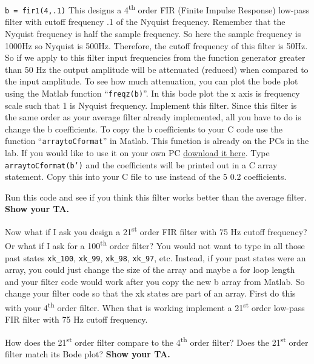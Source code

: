 \documentclass[11pt]{article}
\begin{document}
\texttt{b = fir1(4,.1)} This designs a 4\textsuperscript{th} order FIR (Finite Impulse Response) low-pass filter with cutoff frequency .1 of the Nyquist frequency. Remember that the Nyquist frequency is half the sample frequency. So here the sample frequency is 1000Hz so Nyquist is 500Hz. Therefore, the cutoff frequency of this filter is 50Hz. So if we apply to this filter input frequencies from the function generator greater than 50 Hz the output amplitude will be attenuated (reduced) when compared to the input amplitude. To see how much attenuation, you can plot the bode plot using the Matlab function “\texttt{freqz(b)}”. In this bode plot the x axis is frequency scale such that 1 is Nyquist frequency. Implement this filter. Since this filter is the same order as your average filter already implemented, all you have to do is change the b coefficients. To copy the b coefficients to your C code use the function “\texttt{arraytoCformat}” in Matlab. This function is already on the PCs in the lab. If you would like to use it on your own PC \href{http://coecsl.ece.illinois.edu/se423/arraytoCformat.m}{download it here}. Type \texttt{arraytoCformat(b')} and the coefficients will be printed out in a C array statement. Copy this into your C file to use instead of the 5 0.2 coefficients.
%
\begin{checkoff}
        Run this code and see if you think this filter works better than the average filter. \textbf{Show your TA.}
\end{checkoff}
%
Now what if I ask you design a 21\textsuperscript{st} order FIR filter with 75 Hz cutoff frequency? Or what if I ask for a 100\textsuperscript{th} order filter? You would not want to type in all those past states \texttt{xk_100}, \texttt{xk_99}, \texttt{xk_98}, \texttt{xk_97}, etc. Instead, if your past states were an array, you could just change the size of the array and maybe a for loop length and your filter code would work after you copy the new b array from Matlab. So change your filter code so that the xk states are part of an array. First do this with your 4\textsuperscript{th} order filter. When that is working implement a 21\textsuperscript{st} order low-pass FIR filter with 75 Hz cutoff frequency.
%
\begin{checkoff}
        How does the 21\textsuperscript{st} order filter compare to the 4\textsuperscript{th} order filter? Does the 21\textsuperscript{st} order filter match its Bode plot? \textbf{Show your TA.}
\end{checkoff}
%
\end{document}
